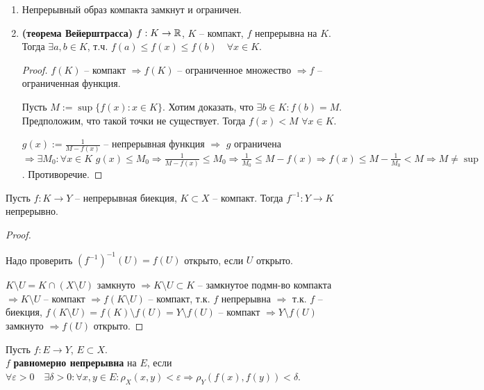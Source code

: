\follow
\begin{enumerate}
    \item Непрерывный образ компакта замкнут и ограничен.
    \item \textbf{(теорема Вейерштрасса)} 
    $f: K \rightarrow \mathbb{R}$, $K$ --
    компакт, $f$ непрерывна на $K$. Тогда $\exists a, b \in K$, т.ч.
    $f(a) \leqslant f(x) \leqslant f(b) \quad \forall x \in K$.

    \begin{proof}
        $f(K)$ -- компакт $\Rightarrow f(K)$ -- ограниченное множество
        $\Rightarrow f$ -- ограниченная функция.
        
        Пусть $M := \sup \{ f(x) : x \in K \}$. Хотим доказать, что 
        $\exists b \in K : f(b) = M$. Предположим, что такой точки
        не существует. Тогда $f(x) < M \,\, \forall x \in K$.

        $g(x) := \frac{1}{M - f(x)}$ -- непрерывная функция $\Rightarrow$
        $g$ ограничена $\Rightarrow \exists M_0 : \forall x \in K \,\,
        g(x) \leqslant M_0 \Rightarrow \frac{1}{M - f(x)} \leqslant M_0 \Rightarrow
        \frac{1}{M_0} \leqslant M - f(x) \Rightarrow f(x) \leqslant M - 
        \frac{1}{M_0} < M \Rightarrow M \neq \sup$. Противоречие.
    \end{proof}
\end{enumerate}

\begin{theorem-non}\end{theorem-non}
Пусть $f : K \rightarrow Y$ -- непрерывная биекция, $K \subset X$ -- 
компакт. Тогда $f^{-1} : Y \rightarrow K$ непрерывно.

\begin{proof} $ $

    Надо проверить $(f^{-1})^{-1}(U) = f(U)$ открыто, если $U$ открыто.

    $K \setminus U = K \cap (X \setminus U)$ замкнуто $\Rightarrow 
    K \setminus U \subset K$ -- замкнутое подмн-во компакта $\Rightarrow
    K \setminus U$ -- компакт $\Rightarrow f(K \setminus U)$ -- компакт,
    т.к. $f$ непрерывна $\Rightarrow$ т.к. $f$ -- биекция, 
    $f(K \setminus U) = f(K) \setminus f(U) = Y \setminus f(U)$ -- 
    компакт $\Rightarrow Y \setminus f(U)$ замкнуто $\Rightarrow
    f(U)$ открыто. 
\end{proof}

\begin{conj}
    Пусть $f : E \rightarrow Y$, $E \subset X$. \\
    $f$ \textbf{равномерно непрерывна} на $E$, если $\forall \varepsilon
    > 0 \quad \exists \delta > 0 : \forall x, y \in E : \rho_X(x, y) <
    \varepsilon \Rightarrow \rho_Y(f(x), f(y)) < \delta$.
\end{conj}

